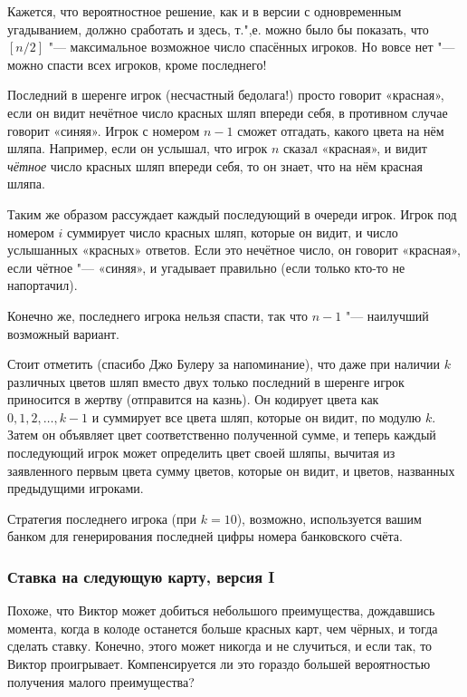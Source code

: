 \documentclass[twoside]{book}
\begin{document}
\medskip

Кажется, что вероятностное решение, как и в версии с одновременным угадыванием, должно сработать и здесь, т.",е. можно было бы показать, что $[n/2]$ "--- максимальное возможное число спасённых игроков.  
Но вовсе нет "--- можно спасти всех игроков, кроме последнего!

Последний в шеренге игрок (несчастный бедолага!) просто говорит
«красная», если он видит нечётное число красных шляп впереди себя, в противном случае говорит «синяя».
Игрок с номером $n-1$ сможет отгадать, какого цвета на нём шляпа.
Например, если он услышал, что игрок $n$ сказал
«красная», и видит \emph{чётное} число красных шляп впереди себя, то он знает, что на нём красная шляпа.

Таким же образом рассуждает каждый последующий в очереди игрок.
Игрок под номером $i$ суммирует число красных шляп, которые он видит, и число услышанных «красных» ответов.
Если это нечётное число, он говорит «красная», если чётное "--- «синяя», и угадывает правильно (если только кто-то не напортачил).

Конечно же, последнего игрока нельзя спасти, так что $n-1$ "--- наилучший возможный вариант.
\heart

Стоит отметить (спасибо Джо Булеру %
за напоминание), что даже при наличии $k$ различных цветов шляп вместо двух только последний в шеренге игрок приносится в жертву (отправится на казнь).
Он кодирует цвета как $0, 1, 2, \dots, k-1$ и суммирует все цвета шляп, которые он видит, по модулю $k$.
Затем он объявляет цвет соответственно полученной сумме, и теперь каждый последующий игрок может определить цвет своей шляпы, вычитая из заявленного первым цвета сумму цветов, которые он видит, и цветов, названных предыдущими игроками.

Стратегия последнего игрока (при $k=10$), возможно, используется вашим банком для генерирования последней цифры номера банковского счёта.

\subsubsection*{Ставка на следующую карту, версия I}%

Похоже, что Виктор может добиться небольшого преимущества, дождавшись момента, когда в колоде останется больше красных карт, чем чёрных, и тогда сделать ставку.
Конечно, этого может никогда и не случиться, и если так, то Виктор проигрывает.
Компенсируется ли это гораздо большей вероятностью получения малого преимущества?
\end{document}
